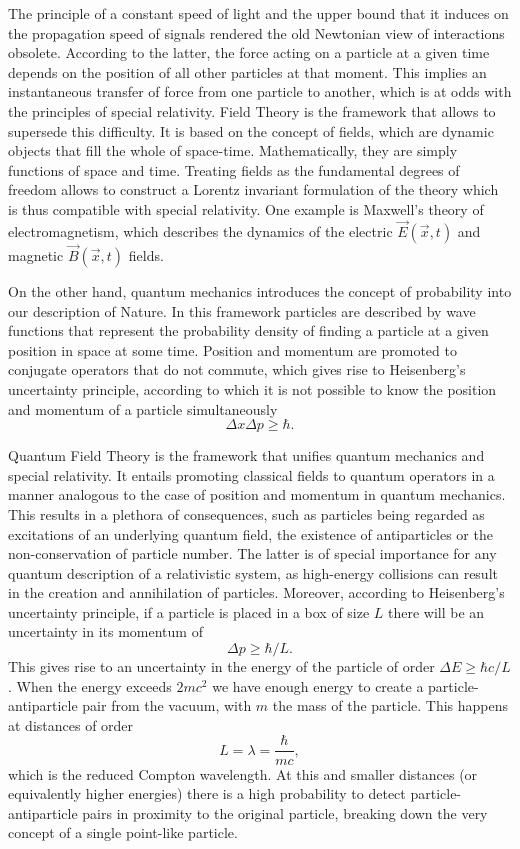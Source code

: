 The principle of a constant speed of light and the upper bound that it induces on the propagation speed of signals rendered the old Newtonian view of interactions obsolete. According to the latter, the force acting on a particle at a given time depends on the position of all other particles at that moment. This implies an instantaneous transfer of force from one particle to another, which is at odds with the principles of special relativity. Field Theory is the framework that allows to supersede this difficulty. It is based on the concept of fields, which are dynamic objects that fill the whole of space-time. Mathematically, they are simply functions of space and time. Treating fields as the fundamental degrees of freedom allows to construct a Lorentz invariant formulation of the theory which is thus compatible with special relativity. One example is Maxwell's theory of electromagnetism, which describes the dynamics of the electric $\vec{E}(\vec{x},t)$ and magnetic $\vec{B}(\vec{x},t)$ fields.

On the other hand, quantum mechanics introduces the concept of probability into our description of Nature. In this framework particles are described by wave functions that represent the probability density of finding a particle at a given position in space at some time. Position and momentum are promoted to conjugate operators that do not commute, which gives rise to Heisenberg's uncertainty principle, according to which it is not possible to know the position and momentum of a particle simultaneously
\begin{equation*}
\Delta x\Delta p\geq\hbar.
\end{equation*} 

Quantum Field Theory is the framework that unifies quantum mechanics and special relativity. It entails promoting classical fields to quantum operators in a manner analogous to the case of position and momentum in quantum mechanics. This results in a plethora of consequences, such as particles being regarded as excitations of an underlying quantum field, the existence of antiparticles or the non-conservation of particle number. The latter is of special importance for any quantum description of a relativistic system, as high-energy collisions can result in the creation and annihilation of  particles. Moreover, according to Heisenberg's uncertainty principle, if a particle is placed in a box of size $L$ there will be an uncertainty in its momentum of
\begin{equation*}
\Delta p\geq\hbar/L.
\end{equation*}
This gives rise to an uncertainty in the energy of the particle of order $\Delta E\geq\hbar c/L$. When the energy exceeds $2mc^2$ we have enough energy to create a particle-antiparticle pair from the vacuum, with $m$ the mass of the particle. This happens at distances of order 
\begin{equation*}
L=\lambda=\frac{\hbar}{mc},
\end{equation*}
which is the reduced Compton wavelength. At this and smaller distances (or equivalently higher energies) there is a high probability to detect particle-antiparticle pairs in proximity to the original particle, breaking down the very concept of a single point-like particle. 

